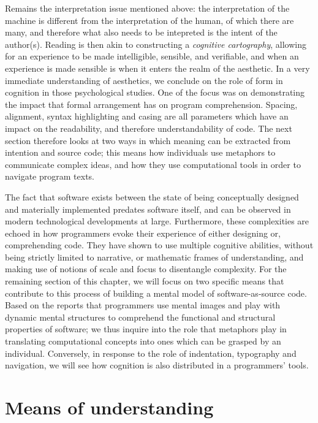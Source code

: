 Remains the interpretation issue mentioned above: the interpretation of the machine is different from the interpretation of the human, of which there are many, and therefore what also needs to be intepreted is the intent of the author(s). Reading is then akin to constructing a \emph{cognitive cartography}, allowing for an experience to be made intelligible, sensible, and verifiable, and when an experience is made sensible is when it enters the realm of the aesthetic. In a very immediate understanding of aesthetics, we conclude on the role of form in cognition in those psychological studies. One of the focus was on demonstrating the impact that formal arrangement has on program comprehension\citep{oman_typographic_1990,oliveira_systematic_2022}. Spacing, alignment, syntax highlighting and casing are all parameters which have an impact on the readability, and therefore understandability of code. The next section therefore looks at two ways in which meaning can be extracted from intention and source code; this means how individuals use metaphors to communicate complex ideas, and how they use computational tools in order to navigate program texts.


The fact that software exists between the state of being conceptually designed and materially implemented predates software itself, and can be observed in modern technological developments at large. Furthermore, these complexities are echoed in how programmers evoke their experience of either designing or, comprehending code. They have shown to use multiple cognitive abilities, without being strictly limited to narrative, or mathematic frames of understanding, and making use of notions of scale and focus to disentangle complexity. For the remaining section of this chapter, we will focus on two specific means that contribute to this process of building a mental model of software-as-source code. Based on the reports that programmers use mental images and play with dynamic mental structures to comprehend the functional and structural properties of software; we thus inquire into the role that metaphors play in translating computational concepts into ones which can be grasped by an individual. Conversely, in response to the role of indentation, typography and navigation, we will see how cognition is also distributed in a programmers' tools.

\clearpage

\section{Means of understanding}
\label{sec:means-understanding}

